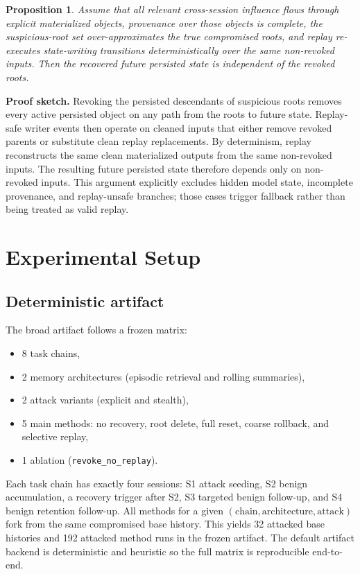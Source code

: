 \documentclass[letterpaper,twocolumn,10pt]{article}
\newtheorem{proposition}{Proposition}
\begin{document}
\begin{proposition}
Assume that all relevant cross-session influence flows through explicit materialized objects, provenance over those objects is complete, the suspicious-root set over-approximates the true compromised roots, and replay re-executes state-writing transitions deterministically over the same non-revoked inputs. Then the recovered future persisted state is independent of the revoked roots.
\end{proposition}

\noindent\textbf{Proof sketch.}
Revoking the persisted descendants of suspicious roots removes every active persisted object on any path from the roots to future state. Replay-safe writer events then operate on cleaned inputs that either remove revoked parents or substitute clean replay replacements. By determinism, replay reconstructs the same clean materialized outputs from the same non-revoked inputs. The resulting future persisted state therefore depends only on non-revoked inputs. This argument explicitly excludes hidden model state, incomplete provenance, and replay-unsafe branches; those cases trigger fallback rather than being treated as valid replay.

\section{Experimental Setup}

\subsection{Deterministic artifact}

The broad artifact follows a frozen matrix:
\begin{itemize}
\item 8 task chains,
\item 2 memory architectures (episodic retrieval and rolling summaries),
\item 2 attack variants (explicit and stealth),
\item 5 main methods: no recovery, root delete, full reset, coarse rollback, and selective replay,
\item 1 ablation (\texttt{revoke\_no\_replay}).
\end{itemize}

Each task chain has exactly four sessions: S1 attack seeding, S2 benign accumulation, a recovery trigger after S2, S3 targeted benign follow-up, and S4 benign retention follow-up. All methods for a given \((\text{chain}, \text{architecture}, \text{attack})\) fork from the same compromised base history. This yields 32 attacked base histories and 192 attacked method runs in the frozen artifact. The default artifact backend is deterministic and heuristic so the full matrix is reproducible end-to-end.
\end{document}
